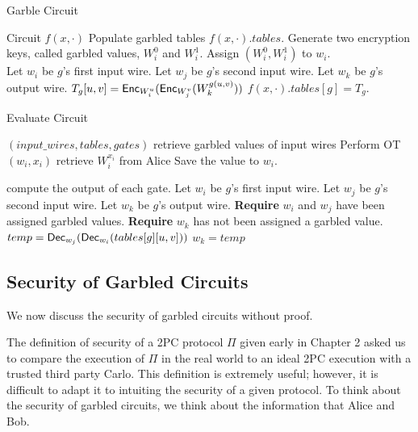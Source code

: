\begin{algorithm}
\caption{Garble Circuit}
\label{alg:garble}
\begin{algorithmic}
    \Require Circuit $f(x,\cdot)$ 
    \Ensure Populate garbled tables $f(x,\cdot).tables$.
    \State Generate two encryption keys, called garbled values, $W_i^0$ and $W_i^1$.
    \State Assign $(W_i^0, W_i^1)$ to $w_i$.
\EndFor \\

    \State Let $w_i$ be $g$'s first input wire.
    \State Let $w_j$ be $g$'s second input wire.
    \State Let $w_k$ be $g$'s output wire.
    \State $T_g[u,v] = \textsf{Enc}_{W_i^u}( \textsf{Enc}_{W_j^v} ( W_k^{g(u,v)}))$
    \EndFor
    \State $f(x,\cdot).tables[g] = T_g$.
\EndFor
\end{algorithmic}
\end{algorithm}

\begin{algorithm}
\caption{Evaluate Circuit}
\label{alg:evaluate}
\begin{algorithmic}

\Require $(input\_wires, tables, gates)$
	\Comment retrieve garbled values of input wires
	\State Perform OT$(w_i, x_i)$ 
	\Comment retrieve $W^{x_i}_i$ from Alice
	\State Save the value to $w_i$.
\EndFor

	\Comment compute the output of each gate.
	\State Let $w_i$ be $g$'s first input wire.
	\State Let $w_j$ be $g$'s second input wire.
	\State Let $w_k$ be $g$'s output wire.
	\State \textbf{Require} $w_i$ and $w_j$ have been assigned garbled values.
	\State \textbf{Require} $w_k$ has not been assigned a garbled value.
		\State $temp = \textsf{Dec}_{w_j}(\textsf{Dec}_{w_i}(tables[g][u,v]))$
			\State $w_k = temp$
		\EndIf
	\EndFor
\EndFor
\end{algorithmic}
\end{algorithm}

\subsection{Security of Garbled Circuits}
We now discuss the security of garbled circuits without proof.

The definition of security of a 2PC protocol $\Pi$ given early in Chapter 2 asked us to compare the execution of $\Pi$ in the real world to an ideal 2PC execution with a trusted third party Carlo.
This definition is extremely useful; however, it is difficult to adapt it to intuiting the security of a given protocol.
To think about the security of garbled circuits, we think about the information that Alice and Bob.

